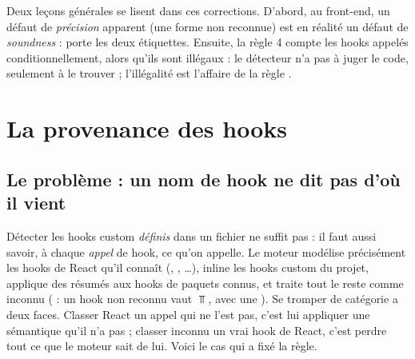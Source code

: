 \begin{piege}
Deux leçons générales se lisent dans ces corrections. D'abord, au front-end, un défaut de \emph{précision} apparent (une forme non reconnue) est en réalité un défaut de \emph{soundness} :  porte les deux étiquettes. Ensuite, la règle 4 compte les hooks appelés conditionnellement, alors qu'ils sont illégaux : le détecteur n'a pas à juger le code, seulement à le trouver ; l'illégalité est l'affaire de la règle .
\end{piege}

\section{La provenance des hooks}
\label{sec:frontend-provenance}

\subsection{Le problème : un nom de hook ne dit pas d'où il vient}

Détecter les hooks custom \emph{définis} dans un fichier ne suffit pas : il faut aussi savoir, à chaque \emph{appel} de hook, ce qu'on appelle. Le moteur modélise précisément les hooks de React qu'il connaît (, , …), inline les hooks custom du projet, applique des résumés aux hooks de paquets connus, et traite tout le reste comme inconnu ( : un hook non reconnu vaut $\Top$, avec une \Info{}). Se tromper de catégorie a deux faces. Classer React un appel qui ne l'est pas, c'est lui appliquer une sémantique qu'il n'a pas ; classer inconnu un vrai hook de React, c'est perdre tout ce que le moteur sait de lui. Voici le cas qui a fixé la règle.

